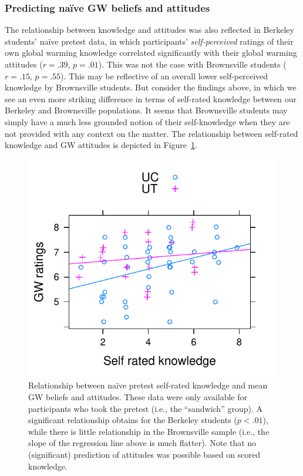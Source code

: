 \subsubsection{Predicting na\"ive GW beliefs and attitudes}

The relationship between knowledge and attitudes was also reflected in Berkeley
students’ naïve pretest data, in which participants’ \emph{self-perceived} ratings of
their own global warming knowledge correlated significantly with their global
warming attitudes ($r = .39$, $p = .01$). This was not the case with
Brownsville students ($r = .15$, $p = .55$). This may be reflective of an overall
lower self-perceived knowledge by Brownsville students. But consider the
findings above, in which we see an even more striking difference in terms of
self-rated knowledge between our Berkeley and Brownsville populations. It seems
that Brownsville students may simply have a much less grounded notion of their
self-knowledge when they are not provided with any context on the matter. The
relationship between self-rated knowledge and GW attitudes is depicted in
Figure~\ref{fig:class-predicting-gw}.

\begin{figure}
    \centering
    \includegraphics{class-predicting-gw.pdf}
    \caption{Relationship between na\"ive pretest self-rated knowledge and mean
        GW beliefs and attitudes. These data were only available for
        participants who took the pretest (i.e., the “sandwich” group). A
        significant relationship obtains for the Berkeley students ($p < .01$),
        while there is little relationship in the Brownsville sample (i.e., the
        slope of the regression line above is much flatter). Note that no
        (significant) prediction of attitudes was possible based on scored
        knowledge.}
    \label{fig:class-predicting-gw}
\end{figure}

